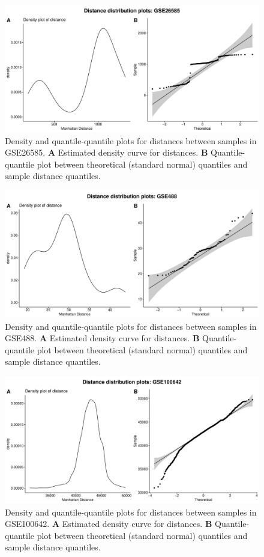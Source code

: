 \documentclass[10pt,letterpaper]{article}\usepackage[]{graphicx}\usepackage[]{color}
\begin{document}
\begin{figure}[H]
	\includegraphics[width=\textwidth]{manhattan-distance_hist_GSE26585.pdf}
	\caption{Density and quantile-quantile plots for distances between samples in GSE26585. \textbf{A} Estimated density curve for distances. \textbf{B} Quantile-quantile plot between theoretical (standard normal) quantiles and sample distance quantiles.}
\end{figure}

\begin{figure}[H]
	\includegraphics[width=\textwidth]{manhattan-distance_hist_GSE488.pdf}
	\caption{Density and quantile-quantile plots for distances between samples in GSE488. \textbf{A} Estimated density curve for distances. \textbf{B} Quantile-quantile plot between theoretical (standard normal) quantiles and sample distance quantiles.}
\end{figure}

\begin{figure}[H]
	\includegraphics[width=\textwidth]{manhattan-distance_hist_GSE100642.pdf}
	\caption{Density and quantile-quantile plots for distances between samples in GSE100642. \textbf{A} Estimated density curve for distances. \textbf{B} Quantile-quantile plot between theoretical (standard normal) quantiles and sample distance quantiles.}
\end{figure}
\end{document}
